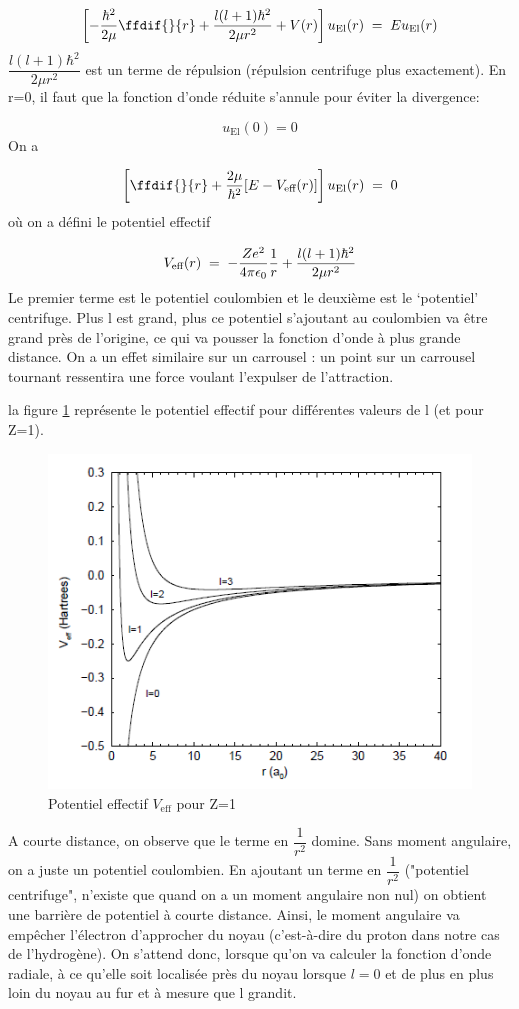\[
    \left[-\dfrac{\hbar^2}{2\mu}\ffdif{}{r}+\dfrac{l(l+1)\hbar^2}{2 \mu r^2}+V(r)\right] u_\text{El}(r)\eq Eu_\text{El}(r)
\]
$\dfrac{l(l+1)\hbar^2}{2\mu r^2}$ est un terme de répulsion (répulsion centrifuge plus exactement). En r=0, il faut que la fonction d'onde réduite s'annule pour éviter la divergence:

\[u_\text{El}(0)=0\]
On a

\begin{equation}
    \left[\ffdif{}{r}+\dfrac{2\mu}{\hbar^2}[E-V_\text{eff}(r)]\right]u_\text{El}(r)\eq 0
    \label{jsp}
\end{equation}
où on a défini le potentiel effectif

\[
    V_\text{eff}(r)\; = \; -\dfrac{Ze^2}{4\pi \epsilon_0}\dfrac{1}{r}+\dfrac{l(l+1)\hbar^2}{2\mu r^2}
\]
Le premier terme est le potentiel coulombien et le deuxième est le `potentiel' centrifuge. Plus l est grand, plus ce potentiel s'ajoutant au coulombien va être grand près de l'origine, ce qui va pousser la fonction d'onde à plus grande distance. On a un effet similaire sur un carrousel : un point sur un carrousel tournant ressentira une force voulant l'expulser de l'attraction.

la figure \ref{fig:potentieleffectif} représente le potentiel effectif pour différentes valeurs de l (et pour Z=1). 

\begin{figure}[tph]
    \centering
    \includegraphics[scale=0.80]{Images2/rad.PNG}
    \caption{Potentiel effectif $V_\text{eff}$ pour Z=1}
    \label{fig:potentieleffectif}
\end{figure}
A courte distance, on observe que le terme en $\dfrac{1}{r^2}$ domine. Sans moment angulaire, on a juste un potentiel coulombien. En ajoutant un terme en $\dfrac{1}{r^2}$ ("potentiel centrifuge", n'existe que quand on a un moment angulaire non nul) on obtient une barrière de potentiel à courte distance. Ainsi, le moment angulaire va empêcher l'électron d'approcher du noyau (c'est-à-dire du proton dans notre cas de l'hydrogène). On s'attend donc, lorsque qu'on va calculer la fonction d'onde radiale, à ce qu'elle soit localisée près du noyau lorsque $l=0$ et de plus en plus loin du noyau au fur et à mesure que l grandit. 


